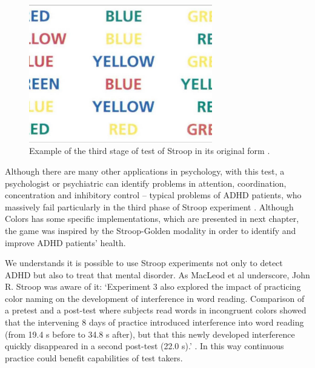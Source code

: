 \begin{figure}[htp]

\begin{center}

  \includegraphics[width=8cm]{chapters/adhd/img/stroop.jpeg}

  \caption{Example of the third stage of test of Stroop in its original form \citep{iStroop}.}

  \label{stroop}

\end{center}

\end{figure}





Although there are many other applications in psychology, with this test, a psychologist or psychiatric can identify problems in attention, coordination, concentration and inhibitory control -- typical problems of ADHD patients, who  massively fail particularly in the third phase of Stroop experiment \citep{lansbergen}. Although Colors has some specific implementations, which are presented in next chapter, the game was inspired by the Stroop-Golden modality in order to identify and improve ADHD patients' health.



We understands it is possible to use Stroop experiments not only to detect ADHD but also to treat that mental disorder. As MacLeod et al underscore,  John R. Stroop was aware of it: `Experiment 3 also explored the impact of practicing color naming on the development of interference in word reading.  Comparison of a pretest and a post-test where subjects read words in incongruent colors showed that the intervening 8 days of practice introduced interference into word reading (from 19.4 s before to 34.8 s after), but that this newly developed interference quickly disappeared in a second post-test (22.0 s).' \citep{macleod}. In this way continuous practice could benefit capabilities of test takers.



